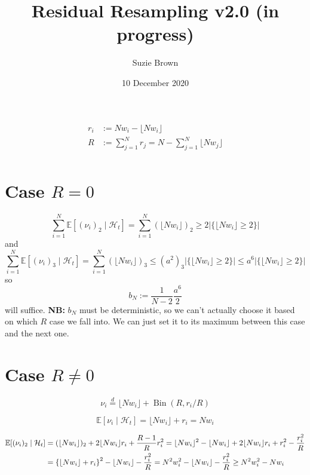 \documentclass{article}
\title{Residual Resampling v2.0 (in progress)}
\author{Suzie Brown}
\date{10 December 2020}
\newcommand{\E}{\mathbb{E}}
\newcommand{\1}[1]{\mathbbm{1}_{#1}}
\newcommand{\flnw}{\lfloor N w_i \rfloor}
\newcommand{\flnj}{\lfloor N w_j \rfloor}
\newcommand{\Ht}{\mathcal{H}_t}
\begin{document}
\maketitle
\thispagestyle{fancy}

\begin{align}
r_i &:= Nw_i - \flnw \\
R &:= \sum_{j=1}^N r_j = N - \sum_{j=1}^N \flnj \\
\end{align}

\section*{Case $R = 0$}

\begin{equation}
\sum_{i=1}^N \E[ (\nu_i)_2 \mid \Ht] = \sum_{i=1}^N (\flnw)_2 \geq 2 | \{ \flnw \geq 2 \} |
\end{equation}
and
\begin{equation}
\sum_{i=1}^N \E[ (\nu_i)_3 \mid \Ht] = \sum_{i=1}^N (\flnw)_3 \leq (a^2)_3 | \{ \flnw \geq 2 \} | \leq a^6 | \{ \flnw \geq 2 \} |
\end{equation}
so
\begin{equation}
b_N := \frac{1}{N-2} \frac{a^6}{2}
\end{equation}
will suffice.
\textbf{NB:} $b_N$ must be deterministic, so we can't actually choose it based on which $R$ case we fall into. We can just set it to its maximum between this case and the next one.

\section*{Case $R \neq 0$}

\begin{equation}
\nu_i \overset{d}{=} \flnw + \operatorname{Bin}(R, r_i/R)
\end{equation}

\begin{equation}
\E[ \nu_i \mid \Ht] = \flnw + r_i = Nw_i
\end{equation}

\begin{align}
\E[ (\nu_i)_2 \mid \Ht] &= (\flnw)_2 + 2\flnw r_i + \frac{R-1}{R} r_i^2
= \flnw^2 - \flnw + 2 \flnw r_i + r_i^2 - \frac{r_i^2}{R} \notag\\
&= \left\{ \flnw + r_i \right\}^2 - \flnw - \frac{r_i^2}{R}
= N^2 w_i^2 - \flnw - \frac{r_i^2}{R}
\geq N^2 w_i^2 - Nw_i
\end{align}
\end{document}
